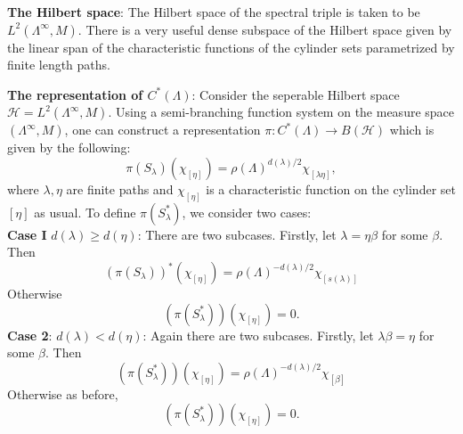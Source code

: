 \documentclass{amsart}
\theoremstyle{plain}
\theoremstyle{definition}
\theoremstyle{remark}
\numberwithin{equation}{section}
\newcommand{\raro}{\rightarrow}
\begin{document}
\indent \textbf{The Hilbert space}: The Hilbert space of the spectral triple is taken to be $L^{2}(\Lambda^{\infty},M)$. There is a very useful dense subspace of the Hilbert space given by the linear span of the characteristic functions of the cylinder sets parametrized by finite length paths. 

\textbf{The representation of $C^{\ast}(\Lambda)$}: Consider the seperable Hilbert space $\mathcal{H}=L^{2}(\Lambda^{\infty},M)$. Using a semi-branching function system on the measure space $(\Lambda^{\infty},M)$, one can construct a representation $\pi: C^{\ast}(\Lambda)\raro B(\mathcal{H})$ which is given by the following: 
\begin{equation}
\label{rep-1}
    \pi(S_{\lambda})(\chi_{[\eta]})= \rho(\Lambda)^{d(\lambda)/2} \chi_{[\lambda\eta]},
\end{equation}
where $\lambda,\eta$ are finite paths and $\chi_{[\eta]}$ is a characteristic function on the cylinder set $[\eta]$ as usual. To define $\pi(S_{\lambda}^{\ast})$, we consider two cases: \\
{\bf Case I} $d(\lambda)\geq d(\eta)$: There are two subcases. Firstly, let $\lambda=\eta\beta$ for some $\beta$. Then 
\begin{equation}
\label{rep-2}
    (\pi(S_{\lambda}))^{\ast}(\chi_{[\eta]})=\rho(\Lambda)^{-d(\lambda)/2}\chi_{[s(\lambda)]}
\end{equation}
Otherwise 
\begin{equation}
\label{rep-2-1}
    (\pi(S_{\lambda}^{\ast}))(\chi_{[\eta]})=0.
\end{equation}
{\bf Case 2}:  $d(\lambda)<d(\eta)$: Again there are two subcases. Firstly, let $\lambda\beta=\eta$ for some $\beta$. Then 
\begin{equation}
\label{rep-3}
    (\pi(S_{\lambda}^{\ast}))(\chi_{[\eta]})=\rho(\Lambda)^{-d(\lambda)/2}\chi_{[\beta]}
\end{equation}
Otherwise as before,
\begin{equation}
\label{rep-3-1}
    (\pi(S_{\lambda}^{\ast}))(\chi_{[\eta]})=0.
\end{equation}
\end{document}
